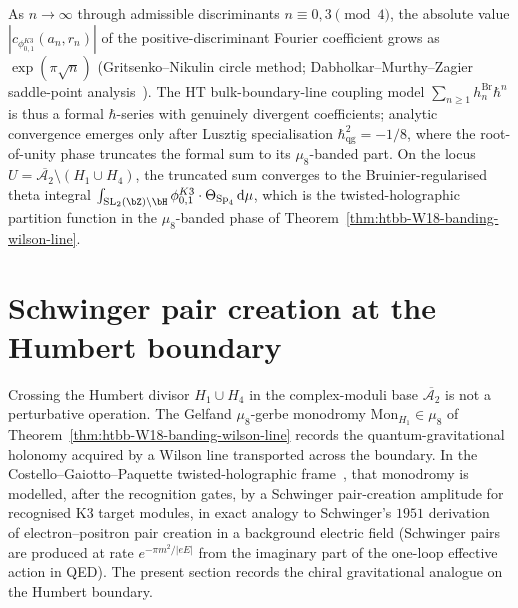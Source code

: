 \begin{remark}
\label{rem:htbb-heegner-convergence-scope}
As $n\to\infty$ through admissible discriminants $n\equiv 0, 3\pmod 4$,
the absolute value \(|c_{\phi_{0,1}^{K3}}(a_n,r_n)|\) of the positive-discriminant
Fourier coefficient grows as $\exp(\pi\sqrt{n})$
\textup{(}Gritsenko--Nikulin circle method;
Dabholkar--Murthy--Zagier saddle-point
analysis~\cite{DabholkarMurthyZagier2012}\textup{).} The
HT bulk-boundary-line coupling model
$\sum_{n\geq 1}h_n^{\mathrm{Br}}\hbar^n$ is thus a formal
$\hbar$-series with genuinely divergent coefficients; analytic
convergence emerges only after Lusztig specialisation
$\hbar_{\mathrm{qg}}^2 = -1/8$, where the root-of-unity phase truncates
the formal sum to its $\mu_8$-banded part. On the locus
$U = \overline{\mathcal{A}_2}\setminus(H_1\cup H_4)$, the truncated sum
converges to the Bruinier-regularised theta integral
\(\int_{\mathrm{SL}_2(\bZ)\backslash\bH}\phi_{0,1}^{K3}\cdot\Theta_{\mathrm{Sp}_4}\,
\mathrm{d}\mu\), which is the twisted-holographic partition function
in the $\mu_8$-banded phase of
Theorem~\ref{thm:htbb-W18-banding-wilson-line}.
\end{remark}

\section{Schwinger pair creation at the Humbert boundary}
\label{sec:htbb-schwinger-humbert}

Crossing the Humbert divisor $H_1\cup H_4$ in the complex-moduli base
$\overline{\mathcal{A}_2}$ is not a perturbative operation. The
Gelfand $\mu_8$-gerbe monodromy $\mathrm{Mon}_{H_1}\in\mu_8$ of
Theorem~\ref{thm:htbb-W18-banding-wilson-line} records the
quantum-gravitational holonomy acquired by a Wilson line transported
across the boundary. In the Costello--Gaiotto--Paquette
twisted-holographic frame~\cite{CostelloGaiottoPaquette2018}, that
monodromy is modelled, after the recognition gates, by a Schwinger
pair-creation amplitude for recognised K3 target modules, in exact
analogy to Schwinger's
$1951$ derivation~\cite{Schwinger1951} of electron--positron pair
creation in a background electric field (Schwinger pairs are produced
at rate $e^{-\pi m^2/|eE|}$ from the imaginary part of the one-loop
effective action in QED). The present section records the chiral
gravitational analogue on the Humbert boundary.

